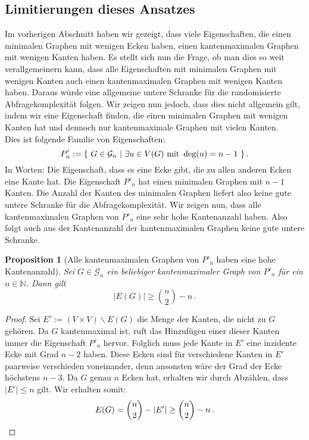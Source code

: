 \documentclass[10pt,a4paper, footheight=1mm, bibliography=totoc]{scrreprt}
\newtheorem{Proposition}[definition]{Proposition}
\theoremstyle{definition}
\begin{document}
\subsection{Limitierungen dieses Ansatzes}
Im vorherigen Abschnitt haben wir gezeigt, dass viele Eigenschaften,
die einen  minimalen Graphen mit wenigen Ecken haben, einen kantenmaximalen
Graphen mit wenigen Kanten haben. Es stellt sich nun die Frage,
ob man dies so weit verallgemeinern kann, dass alle Eigenschaften
mit minimalen Graphen mit wenigen Kanten auch einen kantenmaximalen
Graphen mit wenigen Kanten haben. Daraus würde eine allgemeine
untere Schranke für die randomisierte Abfragekomplexität folgen.
Wir zeigen nun jedoch, dass dies nicht allgemein gilt, indem wir
eine Eigenschaft finden, die einen minimalen Graphen mit wenigen
Kanten hat und dennoch nur kantenmaximale Graphen mit vielen Kanten. \\
Dies ist folgende Familie von Eigenschaften:
$$ P'_n := \{ \ G \in \mathcal{G}_n \ 
| \ \exists u\in V(G) \textup{ mit } \deg(u) = n-1 \ \}\,.$$
In Worten: Die Eigenschaft, dass es eine Ecke gibt,
die zu allen anderen Ecken eine Kante hat.
Die Eigenschaft $P'_n$ hat einen minimalen Graphen mit
$n-1$ Kanten. Die Anzahl der Kanten des minimalen Graphen
liefert also keine gute untere Schranke für die Abfragekomplexität.
Wir zeigen nun, dass alle kantenmaximalen Graphen von $P'_n$
eine sehr hohe Kantenanzahl haben. Also folgt auch aus der Kantenanzahl
der kantenmaximalen Graphen keine gute untere Schranke.
\begin{Proposition}[Alle kantenmaximalen Graphen von $P'_n$ 
             haben eine hohe Kantenanzahl]
Sei $G\in \mathcal{G}_n$ ein beliebiger kantenmaximaler Graph
von $P'_n$ für ein $n\in \mathbb{N}$. Dann gilt
$$ |E(G)| \geq \binom{n}{2} - n\,.$$
\end{Proposition}
\begin{proof}
Sei $E' := (V \times V) \backslash E(G)$ die Menge der Kanten, die nicht
zu $G$ gehören. Da $G$ kantenmaximal ist, ruft das Hinzufügen
einer dieser Kanten immer die Eigenschaft $P'_n$ hervor.
Folglich muss jede Kante in $E'$ eine inzidente Ecke mit Grad
$n-2$ haben. Diese Ecken sind für verschiedene Kanten in $E'$
paarweise verschieden voneinander, denn ansonsten wäre der
Grad der Ecke höchstens $n-3$. Da $G$ genau $n$ Ecken hat,
erhalten wir durch Abzählen, dass $|E'| \leq n$ gilt.
Wir erhalten somit:
\begin{equation*}
E(G) = \binom{n}{2} - |E'| \geq \binom{n}{2} - n\,. \qedhere
\end{equation*}
\end{proof}
\end{document}

